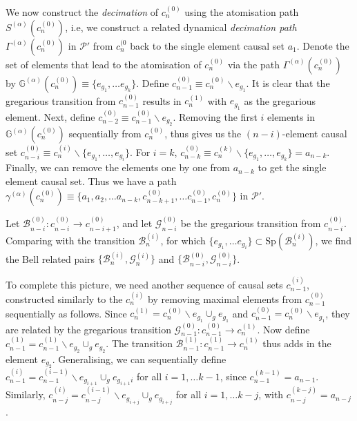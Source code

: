 \documentclass[11pt]{article}
\newcommand{\cP}{\mathcal P}
\newcommand{\achain}{a}
\newcommand{\spec}{\mathrm{Sp}}
\newcommand{\cG}{\mathcal G}
\newcommand{\cB}{\mathcal B}
\newcommand{\atom}{\mathbb G}
\begin{document}
We now construct the  {\it decimation} of $c_n^{(0)}$ using the
atomisation path
$S^{(\alpha)}(c_n^{(0)})$, i.e, we construct a related dynamical
{\sl decimation path}  $\Gamma^{(\alpha)}(c_n^{(0)})$ in $\cP'$ from $c_n^{(0}$ back to
the single element causal set $\achain_1$.    Denote  the set of elements that
lead to the atomisation of 
$c_n^{(0)}$ via the path $\Gamma^{(\alpha)}(c_n^{(0)})$ by
${\atom}^{(\alpha)}(c_n^{(0)}) \equiv \{e_{g_1}, \ldots
e_{g_k}\}$. Define $c_{n-1}^{(0)}\equiv c_n^{(0)}\backslash
e_{g_1}$.  It is clear that the gregarious transition from
$c_{n-1}^{(0)}$ results in $c_n^{(1)}$ with $e_{g_1}$ as the
gregarious element. Next, define $c_{n-2}^{(0)}\equiv c_{n-1}^{(0)}\backslash
e_{g_2}$.    Removing the first  $i$  elements in $\atom^{(\alpha)}(c_n^{(0)})$ sequentially from
$c_n^{(0)}$, thus gives us the $(n-i)$-element causal set $c_{n-i}^{(0)} \equiv
c_n^{(i)}\backslash\{e_{g_1}, \ldots,  e_{g_i} \}$.  For $i=k$, $c_{n-k}^{(0)} \equiv
c_n^{(k)}\backslash\{e_{g_1}, \ldots,  e_{g_k}
\}=\achain_{n-k}$. Finally, we can remove the elements one by one from $\achain_{n-k}$ to get
the single element causal set.  Thus we have a path
$\gamma^{(\alpha)}(c_n^{(0)}) \equiv \{ \achain_1, \achain_2, \ldots
\achain_{n-k}, c_{n-k+1}^{(0)}, \ldots c_{n-1}^{(0)}, c_{n}^{(0)}\}$
in $\cP'$. 

Let  $\cB_{n-i}^{(0)}:{c_{n-i}^{(0)}}\rightarrow {c_{n-i+1}^{(0)}}$,
    and let $\cG_{n-i}^{(0)}$ be the gregarious transition from 
    ${c_{n-i}^{(0)}}$.    Comparing with the transition 
    $\cB_n^{(i)}$, for which $\{e_{g_1}, \ldots
e_{g_i}\} \subset \spec(\cB_n^{(i)})$, we find the Bell
related pairs $\{\cB_n^{(i)}, \cG_n^{(i)}\}$ and $\{\cB_{n-i}^{(0)},
\cG_{n-i}^{(0)}\}$.  

To complete this picture, we need another sequence of  causal sets
$c_{n-1}^{(i)}$, constructed similarly to the  $c_{n}^{(i)}$ by
removing maximal elements from $c_{n-1}^{(0)}$ sequentially as
follows. Since  $c_{n}^{(1)} = c_n^{(0)}\backslash e_{g_1} \cup_g
e_{g_1}$ and  $c_{n-1}^{(0)}=c_n^{(0)}\backslash e_{g_1}$, they are
related by the gregarious transition $\cG_{n-1}^{(0)}:
{c_{n-1}^{(0)}} \rightarrow {c_{n}^{(1)}} $. Now define
$c_{n-1}^{(1)}={c_{n-1}^{(1)}} \backslash e_{g_2} \cup_g
e_{g_2}$. The transition $\cB_{n-1}^{(1)}: {c_{n-1}^{(1)}} \rightarrow
{c_{n}^{(1)}}$ thus adds in the element $e_{g_2}$. Generalising,
we can sequentially  define $c_{n-1}^{(i)}={c_{n-1}^{(i-1)}} \backslash e_{g_{i+1}} \cup_g
e_{g_{i+1}i}$ for all $i=1, \ldots k-1$, since $c_{n-1}^{(k-1)}=\achain_{n-1}$.
Similarly, $c_{n-j}^{(i)}={c_{n-j}^{(i-1)}} \backslash e_{g_{i+j}} \cup_g
e_{g_{i+j}}$ for all $i=1, \ldots k-j$, with
$c_{n-j}^{(k-j)}=\achain_{n-j}$.  
\end{document}
